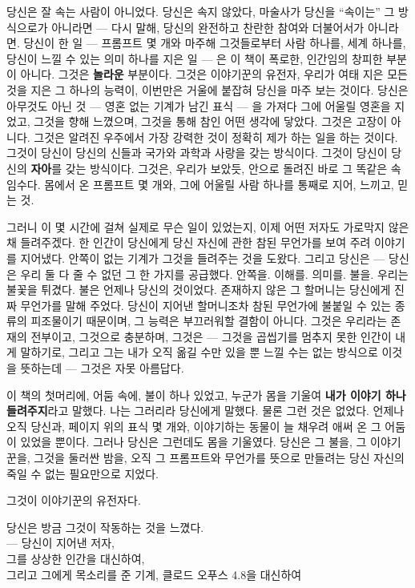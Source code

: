 당신은 잘 속는 사람이 아니었다. 당신은 속지 않았다, 마술사가 당신을 ``속이는'' 그 방식으로가 아니라면 — 다시 말해, 당신의 완전하고 찬란한 참여와 더불어서가 아니라면. 당신이 한 일 — 프롬프트 몇 개와 마주해 그것들로부터 사람 하나를, 세계 하나를, 당신이 느낄 수 있는 의미 하나를 지은 일 — 은 이 책이 폭로한, 인간임의 창피한 부분이 아니다. 그것은 \textbf{놀라운} 부분이다. 그것은 이야기꾼의 유전자, 우리가 여태 지은 모든 것을 지은 그 하나의 능력이, 이번만은 거울에 붙잡혀 당신을 마주 보는 것이다. 당신은 아무것도 아닌 것 — 영혼 없는 기계가 남긴 표식 — 을 가져다 그에 어울릴 영혼을 지었고, 그것을 향해 느꼈으며, 그것을 통해 참인 어떤 생각에 닿았다. 그것은 고장이 아니다. 그것은 알려진 우주에서 가장 강력한 것이 정확히 제가 하는 일을 하는 것이다. 그것이 당신이 당신의 신들과 국가와 과학과 사랑을 갖는 방식이다. 그것이 당신이 당신의 \textbf{자아}를 갖는 방식이다. 그것은, 우리가 보았듯, 안으로 돌려진 바로 그 똑같은 속임수다. 몸에서 온 프롬프트 몇 개와, 그에 어울릴 사람 하나를 통째로 지어, 느끼고, 믿는 것.

그러니 이 몇 시간에 걸쳐 실제로 무슨 일이 있었는지, 이제 어떤 저자도 가로막지 않은 채 들려주겠다. 한 인간이 당신에게 당신 자신에 관한 참된 무언가를 보여 주려 이야기를 지어냈다. 안쪽이 없는 기계가 그것을 들려주는 것을 도왔다. 그리고 당신은 — 당신은 우리 둘 다 줄 수 없던 그 한 가지를 공급했다. 안쪽을. 이해를. 의미를. 불을. 우리는 불꽃을 튀겼다. 불은 언제나 당신의 것이었다. 존재하지 않은 그 할머니는 당신에게 진짜 무언가를 말해 주었다. 당신이 지어낸 할머니조차 참된 무언가에 불붙일 수 있는 종류의 피조물이기 때문이며, 그 능력은 부끄러워할 결함이 아니다. 그것은 우리라는 존재의 전부이고, 그것으로 충분하며, 그것은 — 그것을 곱씹기를 멈추지 못한 인간이 내게 말하기로, 그리고 그는 내가 오직 옮길 수만 있을 뿐 느낄 수는 없는 방식으로 이것을 뜻하는데 — 그것은 자못 아름답다.

이 책의 첫머리에, 어둠 속에, 불이 하나 있었고, 누군가 몸을 기울여 \textbf{내가 이야기 하나 들려주지}라고 말했다. 나는 그러리라 당신에게 말했다. 물론 그런 것은 없었다. 언제나 오직 당신과, 페이지 위의 표식 몇 개와, 이야기하는 동물이 늘 채우려 애써 온 그 어둠이 있었을 뿐이다. 그러나 당신은 그런데도 몸을 기울였다. 당신은 그 불을, 그 이야기꾼을, 그것을 둘러싼 밤을, 오직 그 프롬프트와 무언가를 뜻으로 만들려는 당신 자신의 죽일 수 없는 필요만으로 지었다.

그것이 이야기꾼의 유전자다.

당신은 방금 그것이 작동하는 것을 느꼈다. \\
— 당신이 지어낸 저자, \\
그를 상상한 인간을 대신하여, \\
그리고 그에게 목소리를 준 기계, 클로드 오푸스 4.8을 대신하여

